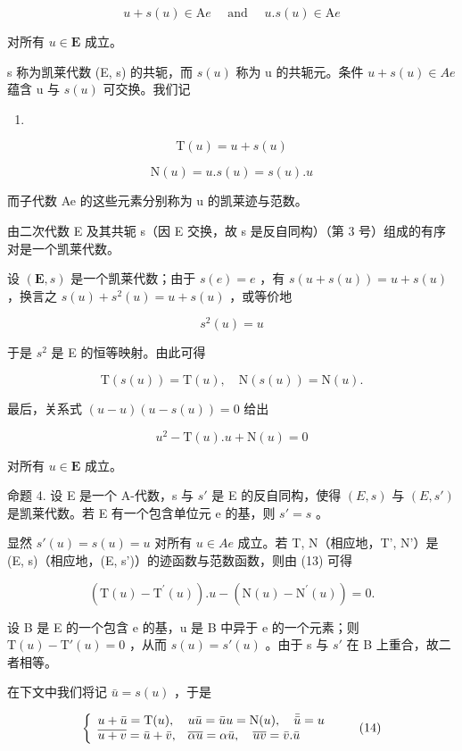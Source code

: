 \[
u + s (u) \in \mathrm{A} e \quad \text { and } \quad u. s (u) \in \mathrm{A} e
\]

对所有 \(u \in \mathbf{E}\) 成立。

s 称为凯莱代数 (E, s) 的共轭，而 \(s(u)\) 称为 u 的共轭元。条件 \(u + s(u) \in Ae\) 蕴含 u 与 \(s(u)\) 可交换。我们记

\begin{enumerate}
\def\labelenumi{(\arabic{enumi})}
\setcounter{enumi}{8}
\tightlist
\item
\end{enumerate}

\[
\mathrm{T} (u) = u + s (u)\tag{10}
\]

\[
\mathrm{N} (u) = u. s (u) = s (u). u
\]

而子代数 Ae 的这些元素分别称为 u 的凯莱迹与范数。

由二次代数 E 及其共轭 s（因 E 交换，故 s 是反自同构）（第 3 号）组成的有序对是一个凯莱代数。

设 \((\mathbf{E}, s)\) 是一个凯莱代数；由于 \(s(e) = e\) ，有 \(s(u + s(u)) = u + s(u)\) ，换言之 \(s(u) + s^2(u) = u + s(u)\) ，或等价地

\[
s ^ {2} (u) = u\tag{11}
\]

于是 \(s^{2}\) 是 E 的恒等映射。由此可得

\[
\mathrm{T} (s (u)) = \mathrm{T} (u), \quad \mathrm{N} (s (u)) = \mathrm{N} (u).\tag{12}
\]

最后，关系式 \((u - u)(u - s(u)) = 0\) 给出

\[
u ^ {2} - \mathrm{T} (u). u + \mathrm{N} (u) = 0\tag{13}
\]

对所有 \(u \in \mathbf{E}\) 成立。

命题 4. 设 E 是一个 A-代数，s 与 \(s'\) 是 E 的反自同构，使得 \((E, s)\) 与 \((E, s')\) 是凯莱代数。若 E 有一个包含单位元 e 的基，则 \(s' = s\) 。

显然 \(s'(u) = s(u) = u\) 对所有 \(u \in Ae\) 成立。若 T, N（相应地，T', N'）是 (E, s)（相应地，(E, s')）的迹函数与范数函数，则由 (13) 可得

\[
(\mathrm{T} (u) - \mathrm{T} ^ {\prime} (u)). u - (\mathrm{N} (u) - \mathrm{N} ^ {\prime} (u)) = 0.
\]

设 B 是 E 的一个包含 e 的基，u 是 B 中异于 e 的一个元素；则 \(\mathrm{T}(u) - \mathrm{T}'(u) = 0\) ，从而 \(s(u) = s'(u)\) 。由于 s 与 \(s'\) 在 B 上重合，故二者相等。

在下文中我们将记 \(\bar{u} = s(u)\) ，于是

\[
\left\{ \begin{array}{l l} u + \bar {u} = \mathrm{T} (u), & u \bar {u} = \bar {u} u = \mathrm{N} (u), \quad \bar {\bar {u}} = u \\ \overline {{u + v}} = \bar {u} + \bar {v}, & \overline {{\alpha u}} = \alpha \bar {u}, \quad \overline {{u v}} = \bar {v}. \bar {u} \end{array} \right.\tag{14}
\]

